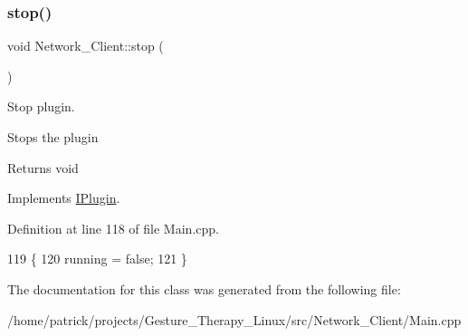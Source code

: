 \subsubsection{\texorpdfstring{stop()}{stop()}}
{\footnotesize\ttfamily void Network\+\_\+\+Client\+::stop (\begin{DoxyParamCaption}{ }\end{DoxyParamCaption})\hspace{0.3cm}{\ttfamily [virtual]}}



Stop plugin. 

Stops the plugin \begin{DoxyReturn}{Returns}
void 
\end{DoxyReturn}


Implements \hyperlink{class_i_plugin_a86e523c283aec5c9fb21249a76e916ac}{I\+Plugin}.



Definition at line 118 of file Main.\+cpp.


\begin{DoxyCode}
119 \{
120     running = \textcolor{keyword}{false};
121 \}
\end{DoxyCode}


The documentation for this class was generated from the following file\+:\begin{DoxyCompactItemize}
\item 
/home/patrick/projects/\+Gesture\+\_\+\+Therapy\+\_\+\+Linux/src/\+Network\+\_\+\+Client/Main.\+cpp\end{DoxyCompactItemize}
